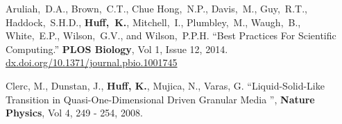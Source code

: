 \documentclass[margin,line]{resume}
\newcommand{\Cyclus}{\textsc{Cyclus}\xspace}%
\begin{document}
\begin{resume}
\begin{bibenum}
       \item Aruliah,~D.A., Brown,~C.T., Chue Hong,~N.P., Davis,~M., Guy,~R.T.,
          Haddock,~S.H.D., \textbf{Huff,~K.}, Mitchell,~I., Plumbley,~M., Waugh,~B.,
          White,~E.P., Wilson,~G.V., and Wilson,~P.P.H.  ``Best Practices For
          Scientific Computing.'' \textbf{PLOS Biology}, Vol 1, Issue 12,
          2014. \url{dx.doi.org/10.1371/journal.pbio.1001745}
       \item Clerc, M., Dunstan, J., \textbf{Huff, K.}, Mujica, N., Varas, G.
          ``Liquid-Solid-Like Transition in Quasi-One-Dimensional Driven
          Granular Media '',  \textbf{Nature Physics}, Vol 4, 249 - 254, 2008.
      \end{bibenum}

\end{resume}
\end{document}

